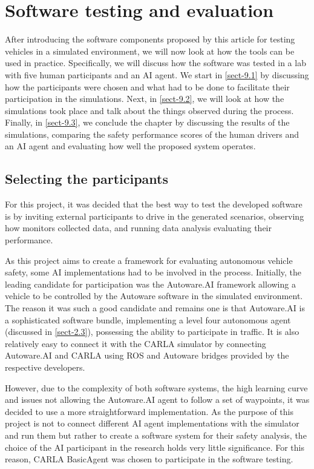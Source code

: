 \chapter{Software testing and evaluation}\label{chap:nine}
After introducing the software components proposed by this article for testing vehicles in a simulated environment, we will now look at how the tools can be used in practice. Specifically, we will discuss how the software was tested in a lab with five human participants and an AI agent. We start in \autoref{sect-9.1} by discussing how the participants were chosen and what had to be done to facilitate their participation in the simulations. Next, in \autoref{sect-9.2}, we will look at how the simulations took place and talk about the things observed during the process. Finally, in \autoref{sect-9.3}, we conclude the chapter by discussing the results of the simulations, comparing the safety performance scores of the human drivers and an AI agent and evaluating how well the proposed system operates.

\section{Selecting the participants} \label{sect-9.1}
For this project, it was decided that the best way to test the developed software is by inviting external participants to drive in the generated scenarios, observing how monitors collected data, and running data analysis evaluating their performance.

As this project aims to create a framework for evaluating autonomous vehicle safety, some AI implementations had to be involved in the process. Initially, the leading candidate for participation was the Autoware.AI framework allowing a vehicle to be controlled by the Autoware software in the simulated environment. The reason it was such a good candidate and remains one is that Autoware.AI is a sophisticated software bundle, implementing a level four autonomous agent (discussed in \autoref{sect-2.3}), possessing the ability to participate in traffic. It is also relatively easy to connect it with the CARLA simulator by connecting Autoware.AI and CARLA using ROS and Autoware bridges provided by the respective developers.

However, due to the complexity of both software systems, the high learning curve and issues not allowing the Autoware.AI agent to follow a set of waypoints, it was decided to use a more straightforward implementation. As the purpose of this project is not to connect different AI agent implementations with the simulator and run them but rather to create a software system for their safety analysis, the choice of the AI participant in the research holds very little significance. For this reason, CARLA BasicAgent was chosen to participate in the software testing.

